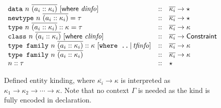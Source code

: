 \begin{figure}

\[
\begin{array}{lcl}
\texttt{data}~n~\overline{(a_i :: \kappa_i)} ~[\textsf{where}~ \mathit{dinfo}] &::& \overline{\kappa_i} \rightarrow \star
\\
\texttt{newtype}~n~\overline{(a_i :: \kappa_i)} = \tau &::& \overline{\kappa_i} \rightarrow \star
\\
\texttt{type}~n~\overline{(a_i :: \kappa_i)} :: \kappa = \tau &::& \overline{\kappa_i} \rightarrow \kappa
\\
\texttt{class}~n~\overline{(a_i :: \kappa_i)} ~[\textsf{where}~ \mathit{clinfo}] &::& \overline{\kappa_i} \rightarrow \textsf{Constraint}
\\
\texttt{type family}~n~\overline{(a_i :: \kappa_i)} :: \kappa ~[\texttt{where ..} \,|\, \mathit{tfinfo}] &::& \overline{\kappa_i} \rightarrow \kappa
\\
\texttt{type family}~n~\overline{(a_i :: \kappa_i)} &::& \overline{\kappa_i} \rightarrow \kappa
\\
n :: \tau &::& \star
\end{array}
\]
\caption{Defined entity kinding, where $\overline{\kappa_i} \rightarrow \kappa$ is interpreted as $\kappa_1 \rightarrow \kappa_2 \rightarrow \cdots \rightarrow \kappa$.  Note that no context $\Gamma$ is needed as the kind is fully encoded in declaration.}
\end{figure}

